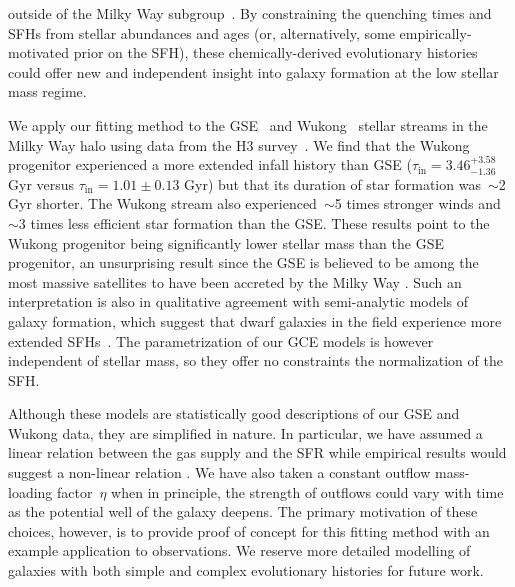 \documentclass[ms.tex]{subfiles}
\begin{document}
outside of the Milky Way subgroup~\citep{Monelli2010a, Monelli2010b,
Weisz2014a}.
By constraining the quenching times and SFHs from stellar abundances and ages
(or, alternatively, some empirically-motivated prior on the SFH), these
chemically-derived evolutionary histories could offer new and independent
insight into galaxy formation at the low stellar mass regime.
\par
We apply our fitting method to the GSE~\citep{Belokurov2018, Helmi2018} and
Wukong~\citep{Naidu2020, Naidu2022} stellar streams in the Milky Way halo using
data from the H3 survey~\citep{Conroy2019}.
We find that the Wukong progenitor experienced a more extended infall history
than GSE ($\tau_\text{in} = 3.46^{+3.58}_{-1.36}$ Gyr versus
$\tau_\text{in} = 1.01 \pm 0.13$ Gyr) but that its duration of star formation
was~$\sim$2 Gyr shorter.
The Wukong stream also experienced~$\sim$5 times stronger winds and~$\sim$3
times less efficient star formation than the GSE.
These results point to the Wukong progenitor being significantly lower stellar
mass than the GSE progenitor, an unsurprising result since the GSE is believed
to be among the most massive satellites to have been accreted by the Milky Way
\citep{Myeong2018, Deason2019, Fattahi2019, Mackereth2019, Vincenzo2019}.
Such an interpretation is also in qualitative agreement with semi-analytic
models of galaxy formation, which suggest that dwarf galaxies in the field
experience more extended SFHs~\citep{Baugh2006, Somerville2015a, Behroozi2019}.
The parametrization of our GCE models is however independent of stellar mass,
so they offer no constraints the normalization of the SFH.
\par
Although these models are statistically good descriptions of our GSE and Wukong
data, they are simplified in nature.
In particular, we have assumed a linear relation between the gas supply and the
SFR while empirical results would suggest a non-linear relation
\citep[e.g.][]{Kennicutt1998, Kennicutt2012, delosReyes2019, Kennicutt2021}.
We have also taken a constant outflow mass-loading factor~$\eta$ when in
principle, the strength of outflows could vary with time as the potential well
of the galaxy deepens.
The primary motivation of these choices, however, is to provide proof of
concept for this fitting method with an example application to observations.
We reserve more detailed modelling of galaxies with both simple and complex
evolutionary histories for future work.
\end{document}
